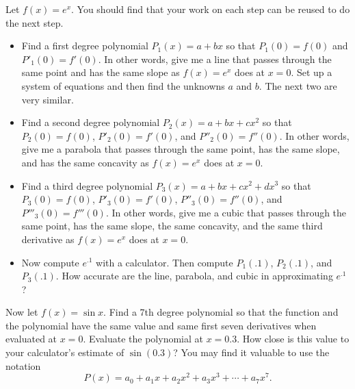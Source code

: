 \begin{problem} 
Let $f(x)=e^x$. You should find that your work on each step can be reused to do the next step.
\begin{itemize}
\item Find a first degree polynomial $P_1(x)=a+bx$ so that $P_1(0)=f(0)$ and $P'_1(0)=f'(0)$. In other words, give me a line that passes through the same point and has the same slope as $f(x)=e^x$ does at $x=0$. Set up a system of equations and then find the unknowns $a$ and $b$. The next two are very similar.
\item Find a second degree polynomial $P_2(x)=a+bx+cx^2$ so that $P_2(0)=f(0)$, $P'_2(0)=f'(0)$, and $P''_2(0)=f''(0)$. In other words, give me a parabola that passes through the same point, has the same slope, and has the same concavity as $f(x)=e^x$ does at $x=0$. 
\item Find a third degree polynomial $P_3(x)=a+bx+cx^2+dx^3$ so that $P_3(0)=f(0)$, $P'_3(0)=f'(0)$, $P''_3(0)=f''(0)$, and $P'''_3(0)=f'''(0)$. In other words, give me a cubic that passes through the same point, has the same slope, the same concavity, and the same third derivative as $f(x)=e^x$ does at $x=0$. 
\item Now compute $e^{.1}$ with a calculator.  Then compute $P_1(.1)$, $P_2(.1)$, and $P_3(.1)$. How accurate are the line, parabola, and cubic in approximating $e^{.1}$?
\end{itemize}
\end{problem} 



\begin{problem} 
 Now let $f(x)=\sin x$. Find a 7th degree polynomial so that the function and the polynomial have the same value and same first seven derivatives when evaluated at $x=0$. Evaluate the polynomial at $x=0.3$. How close is this value to your calculator's estimate of $\sin(0.3)$?  You may find it valuable to use the notation $$P(x) = a_0+a_1x+a_2x^2+a_3x^3 +\cdots+a_7 x^7.$$
\end{problem}




